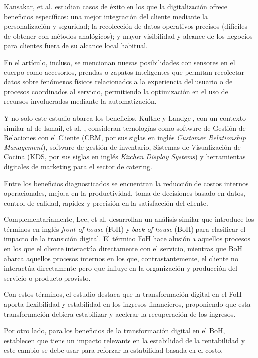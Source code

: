 Kansakar, et al. estudian casos de éxito en los que la digitalización ofrece beneficios específicos: una mejor integración del cliente mediante la personalización y seguridad; la recolección de datos operativos precisos (difíciles de obtener con métodos analógicos); y mayor visibilidad y alcance de los negocios para clientes fuera de su alcance local habitual. 

En el artículo, incluso, se mencionan nuevas posibilidades con sensores en el cuerpo como accesorios, prendas o zapatos inteligentes que permitan recolectar datos sobre fenómenos físicos relacionados a la experiencia del usuario o de procesos coordinados al servicio, permitiendo la optimización en el uso de recursos involucrados mediante la automatización. 

Y no solo este estudio abarca los beneficios. Kulthe y Landge \cite{kulthe2025adoption}, con un contexto similar al de Ismail, et al. \cite{ismail2025perceived}, consideran tecnologías como software de Gestión de Relaciones con el Cliente (CRM, por sus siglas en inglés \textit{Customer Relationship Management}), software de gestión de inventario, Sistemas de Visualización de Cocina (KDS, por sus siglas en inglés \textit{Kitchen Display Systems}) y herramientas digitales de marketing para el sector de catering. 

Entre los beneficios diagnosticados se encuentran la reducción de costos internos operacionales, mejora en la productividad, toma de decisiones basado en datos, control de calidad, rapidez y precisión en la satisfacción del cliente.

Complementariamente, Lee, et al. \cite{woojin2024effect} desarrollan un análisis similar que introduce los términos en inglés \textit{front-of-house} (FoH) y \textit{back-of-house} (BoH) para clasificar el impacto de la transición digital. El término FoH hace alusión a aquellos procesos en los que el cliente interactúa directamente con el servicio, mientras que BoH abarca aquellos procesos internos en los que, contrastantemente, el cliente no interactúa directamente pero que influye en la organización y producción del servicio o producto provisto. 

Con estos términos, el estudio destaca que la transformación digital en el FoH aporta flexibilidad y estabilidad en los ingresos financieros, proponiendo que esta transformación debiera estabilizar y acelerar la recuperación de los ingresos. 

Por otro lado, para los beneficios de la transformación digital en el BoH, establecen que tiene un impacto relevante en la estabilidad de la rentabilidad y este cambio se debe usar para reforzar la estabilidad basada en el costo. 

